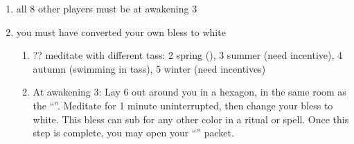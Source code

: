 \documentclass[green]{Emperia}
\begin{document}
\name{\gJesterEscape{}}

\begin{enumerate}
\item all 8 other players must be at awakening 3
\item you must have converted your own bless to white
\begin{enumerate}
\item ?? meditate with different tass: 2 spring (\aClarityofMind{}), 3 summer (need incentive), 4 autumn (swimming in tass), 5 winter (need incentives)
\item At awakening 3: Lay 6 \iJesterTass{} out around you in a hexagon, in the same room as the ``\sFountain{}''. Meditate for 1 minute uninterrupted, then change your bless to white. This bless can sub for any other color in a ritual or spell. Once this step is complete, you may open your ``\mEnlighten{}'' packet.
\end{enumerate}
\end{enumerate}
\end{document}
